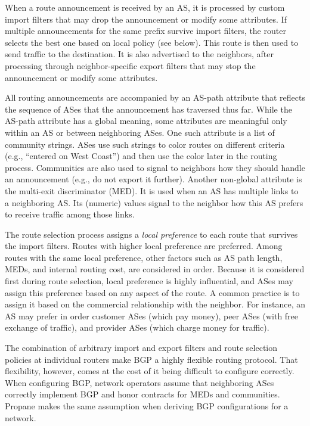 \documentclass[10pt]{sigalternate052015}
\newcommand{\sysname}{{\small \sf Propane}\xspace}
\begin{document}
When a route announcement is received by an AS, it is processed by custom import filters that may drop the announcement or modify some attributes. If multiple announcements for the same prefix survive import filters, the router selects the best one based on local policy (see below). This route is then used to send traffic to the destination. It is also advertised to the neighbors, after processing through neighbor-specific export filters that may stop the announcement or modify some attributes.

All routing announcements are accompanied by an AS-path attribute that reflects the sequence of ASes that the announcement has traversed thus far. While the AS-path attribute has a global meaning, some attributes are meaningful only within an AS or between neighboring ASes.  One such attribute is a list of community strings. ASes use such strings to color routes on different criteria (e.g., ``entered on West Coast'') and then use the color later in the routing process.  Communities are also used to signal to neighbors how they should handle an announcement (e.g., do not export it further). Another non-global attribute is the multi-exit discriminator (MED). It is used when an AS has multiple links to a neighboring AS.  Its (numeric) values signal to the neighbor how this AS prefers to receive traffic among those links.

The route selection process assigns a {\em local preference} to each
route that survives the import filters. Routes with higher local
preference are preferred. Among routes with the same local preference,
other factors such as AS path length, MEDs, and internal routing cost, are considered in order. Because it is considered first during route selection, local preference is highly influential, and ASes may assign this preference based on any aspect of the route. A common practice is to assign it based on the commercial relationship with the neighbor. For instance, an AS may prefer in order customer ASes (which pay money), peer ASes (with free exchange of traffic), and provider ASes (which charge money for traffic).

The combination of arbitrary import and export filters and route selection policies at individual routers make BGP a highly flexible routing protocol. That flexibility, however, comes at the cost of it being difficult to configure correctly.
When configuring BGP, network operators assume that
neighboring ASes correctly implement BGP and honor contracts for MEDs and communities. \sysname makes the same assumption when
deriving BGP configurations for a network.
\end{document}
